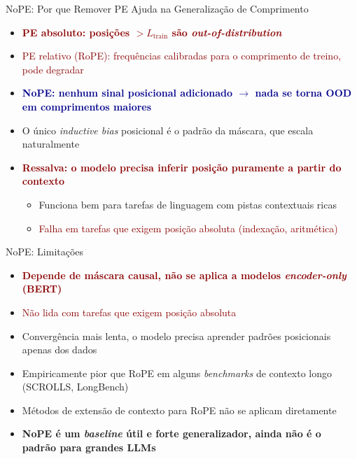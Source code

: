 \documentclass[aspectratio=169, xcolor=dvipsnames]{beamer}
\begin{document}
  \begin{frame}{NoPE: Por que Remover PE Ajuda na Generalização de Comprimento}
    \begin{itemize}
      \item \textcolor{DarkRed}{\textbf{PE absoluto: posições $> L_{\text{train}}$ são \textit{out-of-distribution}}}
      \item \textcolor{DarkRed}{PE relativo (RoPE): frequências calibradas para o comprimento de treino, pode degradar}
      \item \textcolor{DarkBlue}{\textbf{NoPE: nenhum sinal posicional adicionado $\to$ nada se torna OOD em comprimentos maiores}}
      \item O único \textit{inductive bias} posicional é o padrão da máscara, que escala naturalmente
      \item \textcolor{DarkRed}{\textbf{Ressalva: o modelo precisa inferir posição puramente a partir do contexto}}
        \begin{itemize}
          \item Funciona bem para tarefas de linguagem com pistas contextuais ricas
          \item \textcolor{DarkRed}{Falha em tarefas que exigem posição absoluta (indexação, aritmética)}
        \end{itemize}
    \end{itemize}
  \end{frame}

  \begin{frame}{NoPE: Limitações}
    \begin{itemize}
      \item \textcolor{DarkRed}{\textbf{Depende de máscara causal, não se aplica a modelos \textit{encoder-only} (BERT)}}
      \item \textcolor{DarkRed}{Não lida com tarefas que exigem posição absoluta}
      \item Convergência mais lenta, o modelo precisa aprender padrões posicionais apenas dos dados
      \item Empiricamente pior que RoPE em alguns \textit{benchmarks} de contexto longo (SCROLLS, LongBench)
      \item Métodos de extensão de contexto para RoPE não se aplicam diretamente
      \item \textbf{NoPE é um \textit{baseline} útil e forte generalizador, ainda não é o padrão para grandes LLMs}
    \end{itemize}
  \end{frame}
\end{document}
